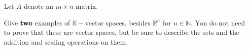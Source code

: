 \documentclass[12pt]{exam}
\begin{document}
\begin{questions}

\question[30] Let $A$ denote an $m\times n$ matrix.
\noaddpoints
{}
\addpoints

\question[20] Give \textbf{two} examples of $\mathbb{R}-$vector spaces, besides $\mathbb{R}^n$ for $n\in \mathbb{N}$. You do not need to prove that these are vector spaces, but be sure to describe the sets and the addition and scaling operations on them.
\addpoints\\\\
\\\\
\\\\
\\\\
\\\\
\\\\
\\\\
\\\\
\\\\


\end{questions}
\end{document}
